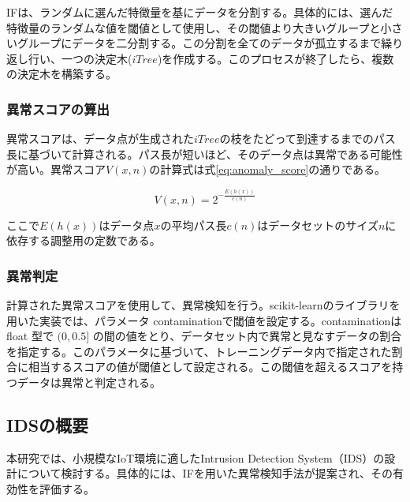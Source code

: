 \documentclass{css}
\begin{document}
IFは、ランダムに選んだ特徴量を基にデータを分割する。具体的には、選んだ特徴量のランダムな値を閾値として使用し、その閾値より大きいグループと小さいグループにデータを二分割する。この分割を全てのデータが孤立するまで繰り返し行い、一つの決定木($iTree$)を作成する。このプロセスが終了したら、複数の決定木を構築する。

\subsubsection{異常スコアの算出}

異常スコアは、データ点が生成された$iTree$の枝をたどって到達するまでのパス長に基づいて計算される。パス長が短いほど、そのデータ点は異常である可能性が高い。異常スコア$V(x,n)$の計算式は式\ref{eq:anomaly_score}の通りである。


\begin{equation}
    V(x, n) = 2^{-\frac{E(h(x))}{c(n)}}
    \label{eq:anomaly_score}
\end{equation}


ここで$E(h(x))$はデータ点$x$の平均パス長$c(n)$はデータセットのサイズ$n$に依存する調整用の定数である。

\subsubsection{異常判定}
計算された異常スコアを使用して、異常検知を行う。scikit-learnのライブラリを用いた実装では、パラメータ contaminationで閾値を設定する。contaminationは float 型で $(0, 0.5]$ の間の値をとり、データセット内で異常と見なすデータの割合を指定する。このパラメータに基づいて、トレーニングデータ内で指定された割合に相当するスコアの値が閾値として設定される。この閾値を超えるスコアを持つデータは異常と判定される。



\subsection{IDSの概要}
本研究では、小規模なIoT環境に適したIntrusion Detection System（IDS）の設計について検討する。具体的には、IFを用いた異常検知手法が提案され、その有効性を評価する。
\end{document}
